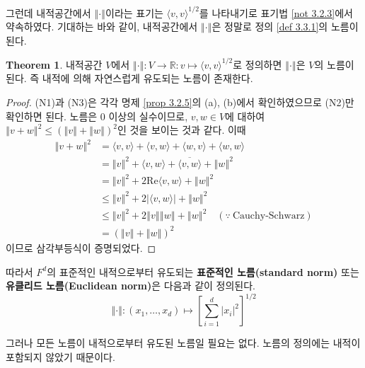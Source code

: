 \documentclass[11pt]{book}
\numberwithin{equation}{chapter}
\def\RR{\mathbb{R}}
\newcommand{\inner}[2]{\langle#1, #2\rangle}
\newcommand{\abs}[1]{\left\vert#1\right\vert}
\newcommand{\norm}[1]{\left\Vert#1\right\Vert}
\newcommand{\sqbracket}[1]{\left[#1\right]}
\theoremstyle{definition}
\newtheorem{thm}{Theorem}[section]
\begin{document}
그런데 내적공간에서 \(\norm{\cdot}\)이라는 표기는 \(\inner{v}{v}^{1/2}\)를 나타내기로 표기법 \ref{not 3.2.3}에서 약속하였다. 기대하는 바와 같이, 내적공간에서 \(\norm{\cdot}\)은 정말로 정의 \ref{def 3.3.1}의 노름이 된다.

\begin{thm}
    내적공간 \(V\)에서 \(\norm{\cdot} : V \to \RR : v \mapsto \inner{v}{v}^{1/2}\)로 정의하면 \(\norm{\cdot}\)은 \(V\)의 노름이 된다. 즉 내적에 의해 자연스럽게 유도되는 노름이 존재한다.
\end{thm}
\begin{proof}
    (N1)과 (N3)은 각각 명제 \ref{prop 3.2.5}의 (a), (b)에서 확인하였으므로 (N2)만 확인하면 된다. 노름은 0 이상의 실수이므로, \(v, w \in V\)에 대하여 \(\norm{v+w}^2 \le (\norm{v} + \norm{w})^2\)인 것을 보이는 것과 같다. 이때
        \begin{align*}
            \norm{v+w}^2 &= \inner{v}{v} + \inner{v}{w} + \inner{w}{v} + \inner{w}{w}\\
            &= \norm{v}^2 + \inner{v}{w} + \overline{\inner{v}{w}} + \norm{w}^2\\
            &= \norm{v}^2 + 2 \mathrm{Re}\inner{v}{w} + \norm{w}^2\\
            &\le \norm{v}^2 + 2\abs{\inner{v}{w}} + \norm{w}^2\\
            &\le \norm{v}^2 + 2\norm{v}\norm{w} + \norm{w}^2 \quad (\because \ \text{Cauchy-Schwarz})\\
            &= (\norm{v} + \norm{w})^2
        \end{align*}
    이므로 삼각부등식이 증명되었다.
\end{proof}

따라서 \(F^d\)의 표준적인 내적으로부터 유도되는 \textbf{표준적인 노름(standard norm)} 또는 \textbf{유클리드 노름(Euclidean norm)}은 다음과 같이 정의된다.
\[
\norm{\cdot} : (x_1, \ldots, x_d) \mapsto \sqbracket{\sum_{i=1}^d \abs{x_i}^2}^{1/2}   
\]

그러나 모든 노름이 내적으로부터 유도된 노름일 필요는 없다. 노름의 정의에는 내적이 포함되지 않았기 때문이다.
\end{document}
